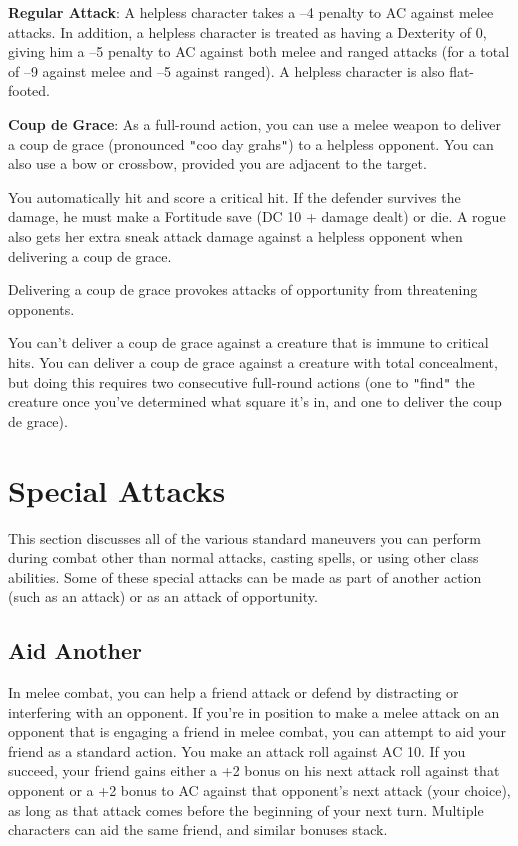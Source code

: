 \textbf{Regular Attack}: A helpless character takes a --4 penalty to AC against melee attacks. In addition, a helpless character is treated as having a Dexterity of 0, giving him a --5 penalty to AC against both melee and ranged attacks (for a total of --9 against melee and --5 against ranged). A helpless character is also flat-footed.
				
\textbf{Coup de Grace}: As a full-round action, you can use a melee weapon to deliver a coup de grace (pronounced \texttt{{}"{}}coo day grahs\texttt{{}"{}}) to a helpless opponent. You can also use a bow or crossbow, provided you are adjacent to the target. 
				
You automatically hit and score a critical hit. If the defender survives the damage, he must make a Fortitude save (DC 10 + damage dealt) or die. A rogue also gets her extra sneak attack damage against a helpless opponent when delivering a coup de grace.
				
Delivering a coup de grace provokes attacks of opportunity from threatening opponents.
				
You can't deliver a coup de grace against a creature that is immune to critical hits. You can deliver a coup de grace against a creature with total concealment, but doing this requires two consecutive full-round actions (one to \texttt{{}"{}}find\texttt{{}"{}} the creature once you've determined what square it's in, and one to deliver the coup de grace).
				
\section{Special Attacks}

				
This section discusses all of the various standard maneuvers you can perform during combat other than normal attacks, casting spells, or using other class abilities. Some of these special attacks can be made as part of another action (such as an attack) or as an attack of opportunity.
				
\subsection{Aid Another}

				
In melee combat, you can help a friend attack or defend by distracting or interfering with an opponent. If you're in position to make a melee attack on an opponent that is engaging a friend in melee combat, you can attempt to aid your friend as a standard action. You make an attack roll against AC 10. If you succeed, your friend gains either a +2 bonus on his next attack roll against that opponent or a +2 bonus to AC against that opponent's next attack (your choice), as long as that attack comes before the beginning of your next turn. Multiple characters can aid the same friend, and similar bonuses stack.
				
